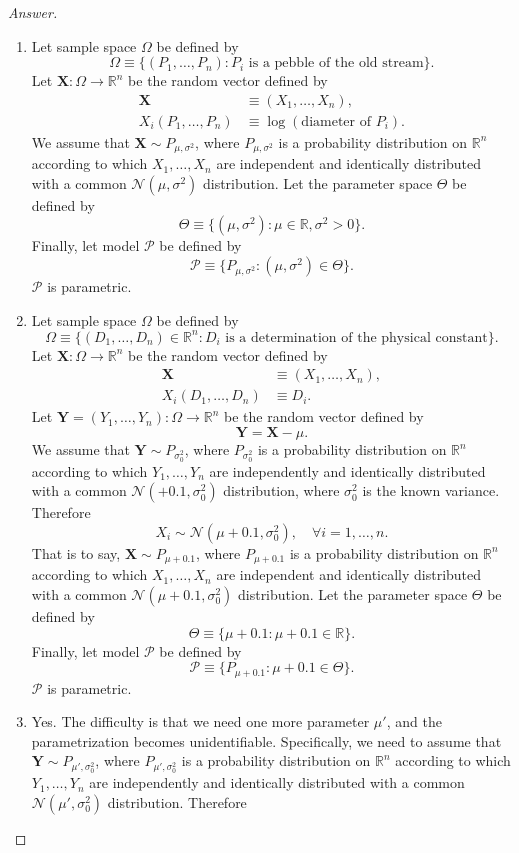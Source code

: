 \documentclass{amsbook}
\theoremstyle{definition}
\theoremstyle{remark}
\numberwithin{section}{chapter}
\numberwithin{equation}{chapter}
\begin{document}
\begin{proof}[Answer]
\begin{enumerate}[label=(\alph*)]
\item Let sample space $\Omega$ be defined by\[
\Omega\equiv\{(P_1,\dots,P_n):P_i\text{ is a pebble of the old stream}\}.
\]Let $\mathbf{X}:\Omega\to\mathbb{R}^n$ be the random vector defined by\[
\begin{split}
\mathbf{X}&\equiv(X_1,\dots,X_n),\\
X_i(P_1,\dots,P_n)&\equiv\log(\text{diameter of }P_i).
\end{split}
\]We assume that $\mathbf{X}\sim P_{\mu,\sigma^2}$, where $P_{\mu,\sigma^2}$ is a probability distribution on $\mathbb{R}^n$ according to which $X_1,\dots,X_n$ are independent and identically distributed with a common $\mathcal{N}(\mu,\sigma^2)$ distribution. Let the parameter space $\Theta$ be defined by\[
\Theta\equiv\{(\mu,\sigma^2):\mu\in\mathbb{R},\sigma^2>0\}.
\]Finally, let model $\mathcal{P}$ be defined by\[
\mathcal{P}\equiv\{P_{\mu,\sigma^2}:(\mu,\sigma^2)\in\Theta\}.
\]$\mathcal{P}$ is parametric.
\item Let sample space $\Omega$ be defined by\[
\Omega\equiv\{(D_1,\dots,D_n)\in\mathbb{R}^n:D_i\text{ is a determination of the physical constant}\}.
\]Let $\mathbf{X}:\Omega\to\mathbb{R}^n$ be the random vector defined by\[
\begin{split}
\mathbf{X}&\equiv(X_1,\dots,X_n),\\
X_i(D_1,\dots,D_n)&\equiv D_i.
\end{split}
\]Let $\mathbf{Y}=(Y_1,\dots,Y_n):\Omega\to\mathbb{R}^n$ be the random vector defined by\[
\mathbf{Y}=\mathbf{X}-\mu.
\]We assume that $\mathbf{Y}\sim P_{\sigma_0^2}$, where $P_{\sigma_0^2}$ is a probability distribution on $\mathbb{R}^n$ according to which $Y_1,\dots,Y_n$ are independently and identically distributed with a common $\mathcal{N}(+0.1,\sigma_0^2)$ distribution, where $\sigma_0^2$ is the known variance. Therefore\[
X_i\sim\mathcal{N}(\mu+0.1,\sigma_0^2),\quad\forall i=1,\dots,n.
\]That is to say, $\mathbf{X}\sim P_{\mu+0.1}$, where $P_{\mu+0.1}$ is a probability distribution on $\mathbb{R}^n$ according to which $X_1,\dots,X_n$ are independent and identically distributed with a common $\mathcal{N}(\mu+0.1,\sigma_0^2)$ distribution. Let the parameter space $\Theta$ be defined by\[
\Theta\equiv\{\mu+0.1:\mu+0.1\in\mathbb{R}\}.
\]Finally, let model $\mathcal{P}$ be defined by\[
\mathcal{P}\equiv\{P_{\mu+0.1}:\mu+0.1\in\Theta\}.
\]$\mathcal{P}$ is parametric.
\item Yes. The difficulty is that we need one more parameter $\mu'$, and the parametrization becomes unidentifiable. Specifically, we need to assume that $\mathbf{Y}\sim P_{\mu',\sigma_0^2}$, where $P_{\mu',\sigma_0^2}$ is a probability distribution on $\mathbb{R}^n$ according to which $Y_1,\dots,Y_n$ are independently and identically distributed with a common $\mathcal{N}(\mu',\sigma_0^2)$ distribution. Therefore\[
\]
\end{enumerate}
\end{proof}
\end{document}
